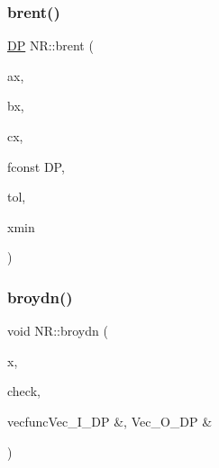 \subsubsection{\texorpdfstring{brent()}{brent()}\hspace{0.1cm}{\footnotesize\ttfamily [2/2]}}
{\footnotesize\ttfamily \mbox{\hyperlink{namespaceNR_af6ff762dd605ff477b8e52387253a02a}{DP}} N\+R\+::brent (\begin{DoxyParamCaption}\item[{const \mbox{\hyperlink{namespaceNR_af6ff762dd605ff477b8e52387253a02a}{DP}}}]{ax,  }\item[{const \mbox{\hyperlink{namespaceNR_af6ff762dd605ff477b8e52387253a02a}{DP}}}]{bx,  }\item[{const \mbox{\hyperlink{namespaceNR_af6ff762dd605ff477b8e52387253a02a}{DP}}}]{cx,  }\item[{\mbox{\hyperlink{namespaceNR_af6ff762dd605ff477b8e52387253a02a}{DP}} }]{fconst DP,  }\item[{const \mbox{\hyperlink{namespaceNR_af6ff762dd605ff477b8e52387253a02a}{DP}}}]{tol,  }\item[{\mbox{\hyperlink{namespaceNR_af6ff762dd605ff477b8e52387253a02a}{DP}} \&}]{xmin }\end{DoxyParamCaption})}

\mbox{\label{namespaceNR_a11b0d45adeba8de27502be58cc893210}} 
\subsubsection{\texorpdfstring{broydn()}{broydn()}}
{\footnotesize\ttfamily void N\+R\+::broydn (\begin{DoxyParamCaption}\item[{\mbox{\hyperlink{namespaceNR_ab293e06a6bf799d8a7ed932b6852bcb8}{Vec\+\_\+\+I\+O\+\_\+\+DP}} \&}]{x,  }\item[{bool \&}]{check,  }\item[{void }]{vecfuncVec\+\_\+\+I\+\_\+\+D\+P \&, Vec\+\_\+\+O\+\_\+\+D\+P \& }\end{DoxyParamCaption})}

\mbox{\label{namespaceNR_a2fc62044e08a4a33016b21cba60408be}} 
